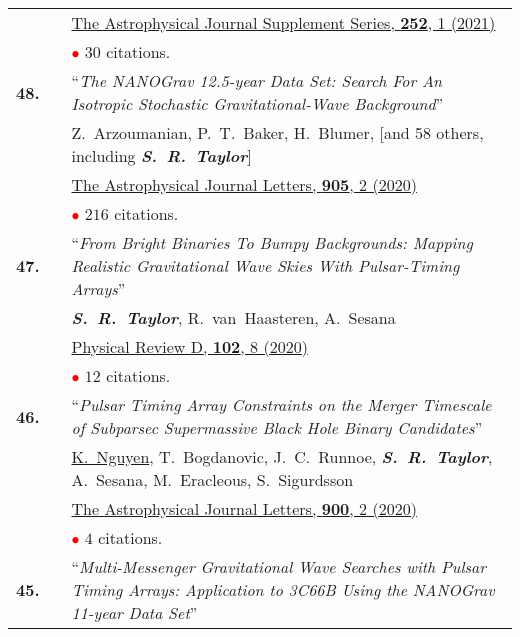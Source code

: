 \documentclass[11pt,letterpaper,sans]{moderncv}
\begin{document}
{\begin{longtable}{rp{0.3cm}p{15.8cm}}
&& \href{https://ui.adsabs.harvard.edu/link_gateway/2021ApJS..252....4A/doi:10.3847/1538-4365/abc6a0}{{\color{color1} The Astrophysical Journal Supplement Series, \textbf{252}, 1 (2021)}} \\
&& \textcolor{red}{$\bullet$} $30$ citations. \vspace{0.09cm}\\
\textbf{48.} & & ``\textit{The NANOGrav 12.5-year Data Set: Search For An Isotropic Stochastic Gravitational-Wave Background}'' \\ 
&&Z.~Arzoumanian, P.~T.~Baker, H.~Blumer, [and 58 others, including \textit{\textbf{S.~R.~Taylor}}] \\
&& \href{https://ui.adsabs.harvard.edu/link_gateway/2020ApJ...905L..34A/doi:10.3847/2041-8213/abd401}{{\color{color1} The Astrophysical Journal Letters, \textbf{905}, 2 (2020)}} \vspace{0.09cm}\\
&& \textcolor{red}{$\bullet$} $216$ citations. \vspace{0.09cm}\\
\textbf{47.} & & ``\textit{From Bright Binaries To Bumpy Backgrounds: Mapping Realistic Gravitational Wave Skies With Pulsar-Timing Arrays}'' \\ 
&&\textit{\textbf{S.~R.~Taylor}}, R.~van~Haasteren, A.~Sesana \\
&& \href{https://ui.adsabs.harvard.edu/link_gateway/2020PhRvD.102h4039T/doi:10.1103/PhysRevD.102.084039}{{\color{color1} Physical Review D, \textbf{102}, 8 (2020)}} \vspace{0.09cm} \\
&& \textcolor{red}{$\bullet$} $12$ citations. \vspace{0.09cm}\\
\textbf{46.} & & ``\textit{Pulsar Timing Array Constraints on the Merger Timescale of Subparsec Supermassive Black Hole Binary Candidates}'' \\ 
&&\underline{K.~Nguyen}, T.~Bogdanovic, J.~C.~Runnoe, \textit{\textbf{S.~R.~Taylor}}, A.~Sesana, M.~Eracleous, S.~Sigurdsson \\
&& \href{https://ui.adsabs.harvard.edu/link_gateway/2020ApJ...900L..42N/doi:10.3847/2041-8213/abb2ab}{{\color{color1} The Astrophysical Journal Letters, \textbf{900}, 2 (2020)}} \vspace{0.09cm} \\
&& \textcolor{red}{$\bullet$} $4$ citations. \vspace{0.09cm}\\
\textbf{45.} & & ``\textit{Multi-Messenger Gravitational Wave Searches with Pulsar Timing Arrays: Application to 3C66B Using the NANOGrav 11-year Data Set}'' \\ 

\end{longtable}}
\end{document}
